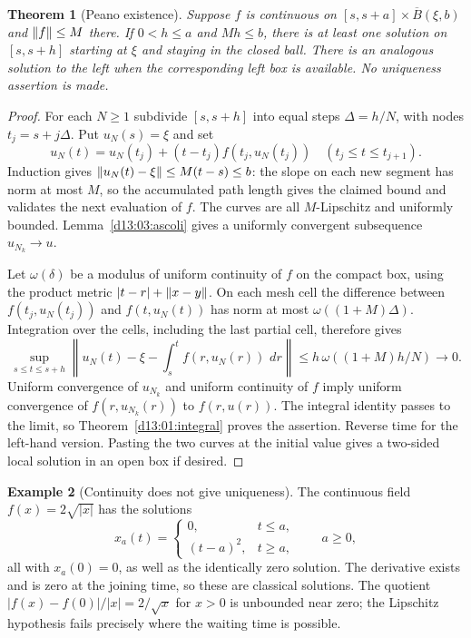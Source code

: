 \documentclass[11pt,oneside]{book}
\newtheorem{theorem}{Theorem}[chapter]
\theoremstyle{definition}
\newtheorem{example}[theorem]{Example}
\theoremstyle{remark}\newtheorem{remark}[theorem]{Remark}
\newcommand{\dd}{\,d}\newcommand{\id}{\operatorname{id}}
\begin{document}
\begin{theorem}[Peano existence]\label{d13:03:peano}
Suppose $f$ is continuous on
$[s,s+a]\times\overline B(\xi,b)$ and $\lVert f\rVert\leq M$ there.
If $0<h\leq a$ and $Mh\leq b$, there is at least one solution on
$[s,s+h]$ starting at $\xi$ and staying in the closed ball. There is
an analogous solution to the left when the corresponding left box is
available. No uniqueness assertion is made.
\end{theorem}
\begin{proof}
For each $N\geq1$ subdivide $[s,s+h]$ into equal steps
$\Delta=h/N$, with nodes $t_j=s+j\Delta$. Put $u_N(s)=\xi$ and set
\[
 u_N(t)=u_N(t_j)+(t-t_j)f(t_j,u_N(t_j))
 \quad(t_j\leq t\leq t_{j+1}).
\]
Induction gives $\lVert u_N(t)-\xi\rVert\leq M(t-s)\leq b$:
the slope on each new segment has norm at most $M$, so the accumulated
path length gives the claimed bound and validates the next evaluation
of $f$. The curves are all $M$-Lipschitz and uniformly bounded.
Lemma~\ref{d13:03:ascoli} gives a uniformly convergent subsequence
$u_{N_k}\to u$.

Let $\omega(\delta)$ be a modulus of uniform continuity of $f$ on
the compact box, using the product metric $|t-r|+\lVert x-y\rVert$.
On each mesh cell the difference between
$f(t_j,u_N(t_j))$ and $f(t,u_N(t))$ has norm at most
$\omega((1+M)\Delta)$. Integration over the cells, including the last
partial cell, therefore gives
\[
 \sup_{s\leq t\leq s+h}
 \left\|u_N(t)-\xi-\int_s^t f(r,u_N(r))\,\dd r\right\|
 \leq h\,\omega((1+M)h/N)\longrightarrow0.
\]
Uniform convergence of $u_{N_k}$ and uniform continuity of $f$ imply
uniform convergence of $f(r,u_{N_k}(r))$ to $f(r,u(r))$.
The integral identity passes to the limit, so
Theorem~\ref{d13:01:integral} proves the assertion. Reverse time for
the left-hand version. Pasting the two curves at the initial value
gives a two-sided local solution in an open box if desired.
\end{proof}

\begin{example}[Continuity does not give uniqueness]\label{d13:03:nonunique}
The continuous field $f(x)=2\sqrt{|x|}$ has the solutions
\[
 x_a(t)=\begin{cases}0,&t\leq a,\\(t-a)^2,&t\geq a,\end{cases}
 \qquad a\geq0,
\]
all with $x_a(0)=0$, as well as the identically zero solution. The
derivative exists and is zero at the joining time, so these are
classical solutions. The quotient
$|f(x)-f(0)|/|x|=2/\sqrt{x}$ for $x>0$ is unbounded near zero;
the Lipschitz hypothesis fails precisely where the waiting time is
possible.
\end{example}
\end{document}
